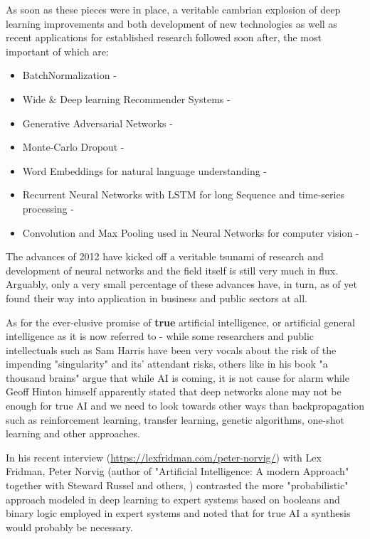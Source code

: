 As soon as these pieces were in place, a veritable cambrian explosion of deep learning improvements and both development of new technologies as well as recent applications for established research followed soon after, the most important of which are:

\begin{itemize}
	\item BatchNormalization - \cite{ioffe2015batch}
	\item Wide \& Deep learning Recommender Systems - \cite{cheng2016wide}
	\item Generative Adversarial Networks - \cite{goodfellow2014generative}
	\item Monte-Carlo Dropout - \cite{gal2016dropout}
	\item Word Embeddings for natural language understanding - \cite{mikolov2013distributed}
	\item Recurrent Neural Networks with \ac{LSTM} for long Sequence and time-series processing - \cite{hochreiter1997long}
	\item Convolution and Max Pooling used in Neural Networks for computer vision - \cite{378228}
\end{itemize}

The advances of 2012 have kicked off a veritable tsunami of research and development of neural networks and the field itself is still very much in flux. Arguably, only a very small percentage of these advances have, in turn, as of yet found their way into application in business and public sectors at all.

As for the ever-elusive promise of \textbf{true} artificial intelligence, or artificial general intelligence as it is now referred to - while some researchers and public intellectuals such as Sam Harris have been very vocals about the risk of the impending "singularity" and its' attendant risks, others like \cite{thousand} in his book "a thousand brains" argue that while \ac{AI} is coming, it is not cause for alarm while Geoff Hinton himself apparently stated that deep networks alone may not be enough for true \ac{AI} and we need to look towards other ways than backpropagation such as reinforcement learning, transfer learning, genetic algorithms, one-shot learning and other approaches.

In his recent interview (\url{https://lexfridman.com/peter-norvig/}) with Lex Fridman, Peter Norvig (author of "Artificial Intelligence: A modern Approach" together with Steward Russel and others, \cite{russell2002artificial} ) contrasted the more "probabilistic" approach modeled in deep learning to expert systems based on booleans and binary logic employed in expert systems and noted that for true \ac{AI} a synthesis would probably be necessary.

